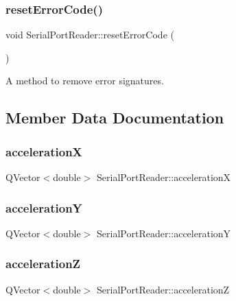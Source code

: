 \subsubsection{reset\+Error\+Code()}
{\footnotesize\ttfamily void Serial\+Port\+Reader\+::reset\+Error\+Code (\begin{DoxyParamCaption}{ }\end{DoxyParamCaption})}



A method to remove error signatures. 



\subsection{Member Data Documentation}
\mbox{\label{class_serial_port_reader_a2224bf8c59a93b8a5ef77eace260c34c}} 
\subsubsection{accelerationX}
{\footnotesize\ttfamily Q\+Vector$<$double$>$ Serial\+Port\+Reader\+::accelerationX\hspace{0.3cm}{\ttfamily [private]}}

\mbox{\label{class_serial_port_reader_a86769450ee3907fe92dc9714f7982f26}} 
\subsubsection{accelerationY}
{\footnotesize\ttfamily Q\+Vector$<$double$>$ Serial\+Port\+Reader\+::accelerationY\hspace{0.3cm}{\ttfamily [private]}}

\mbox{\label{class_serial_port_reader_aa500a86c782f296ca529f0f4d5145366}} 
\subsubsection{accelerationZ}
{\footnotesize\ttfamily Q\+Vector$<$double$>$ Serial\+Port\+Reader\+::accelerationZ\hspace{0.3cm}{\ttfamily [private]}}

